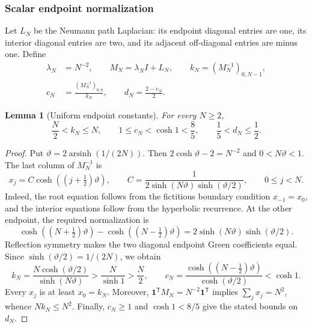 \documentclass[11pt,letterpaper]{article}
\newtheorem{lemma}[theorem]{Lemma}
\theoremstyle{definition}
\theoremstyle{remark}
\begin{document}
\subsubsection{Scalar endpoint normalization}

Let $L_N$ be the Neumann path Laplacian: its endpoint diagonal entries are
one, its interior diagonal entries are two, and its adjacent off-diagonal
entries are minus one.  Define
\begin{equation}
\begin{split}
 \lambda_N&=N^{-2},\qquad M_N=\lambda_N I+L_N,
 \qquad k_N=(M_N^{-1})_{0,N-1},\\
 c_N&=\frac{(M_N^{-1})_{0,0}}{k_N},
 \qquad d_N=\frac{2-c_N}{2}.
\end{split}
\label{eq:scalar-endpoint-normalization}
\end{equation}

\begin{lemma}[Uniform endpoint constants]
\label{lem:endpoint-constants}
For every $N\ge2$,
\[
 \frac N2<k_N\le N,
 \qquad 1\le c_N<\cosh 1<\frac85,
 \qquad \frac15<d_N\le\frac12.
\]
\end{lemma}

\begin{proof}
Put $\vartheta=2\operatorname{arsinh}(1/(2N))$.  Then
$2\cosh\vartheta-2=N^{-2}$ and $0<N\vartheta<1$.
The last column of $M_N^{-1}$ is
\[
 x_j=C\cosh((j+\tfrac12)\vartheta),\qquad
 C=\frac1{2\sinh(N\vartheta)\sinh(\vartheta/2)},
 \qquad 0\le j<N.
\]
Indeed, the root equation follows from the fictitious boundary condition
$x_{-1}=x_0$, and the interior equations follow from the hyperbolic
recurrence.  At the other endpoint, the required normalization is
\[
 \cosh((N+\tfrac12)\vartheta)
 -\cosh((N-\tfrac12)\vartheta)
 =2\sinh(N\vartheta)\sinh(\vartheta/2).
\]
Reflection symmetry makes the two diagonal endpoint Green coefficients
equal.  Since $\sinh(\vartheta/2)=1/(2N)$, we obtain
\[
 k_N=\frac{N\cosh(\vartheta/2)}{\sinh(N\vartheta)}
 >\frac N{\sinh1}>\frac N2,
 \qquad
 c_N=\frac{\cosh((N-\tfrac12)\vartheta)}
 {\cosh(\vartheta/2)}<\cosh1.
\]
Every $x_j$ is at least $x_0=k_N$.  Moreover,
$\mathbf 1^{\mathsf T}M_N=N^{-2}\mathbf 1^{\mathsf T}$ implies
$\sum_jx_j=N^2$, whence $Nk_N\le N^2$.  Finally,
$c_N\ge1$ and $\cosh1<8/5$ give the stated bounds on $d_N$.
\end{proof}
\end{document}
